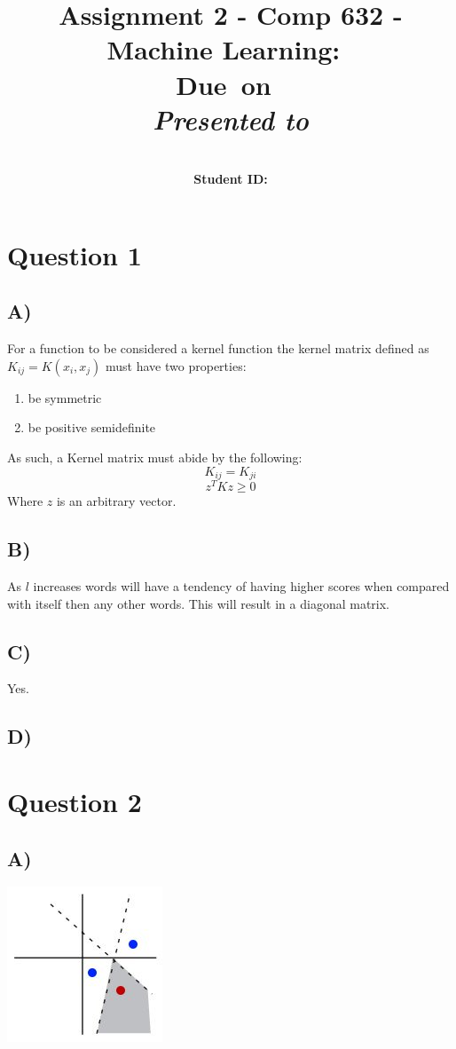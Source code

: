 \documentclass{report}
\title{Assignment 2 - Comp 632 - Machine Learning}
\title{\vspace{2in}\textmd{\textbf{\hmwkClass:\ \hmwkTitle}}\\
\normalsize\vspace{0.1in}\small{Due\ on\ \hmwkDueDate}\\
\vspace{0.1in}\large{\textit{Presented to \hmwkClassInstructor}}\vspace{3in}}
\date{}
\author{\textbf{\hmwkAuthorName}\\
    \textbf{Student ID: \hmwkAuthorNumber}}
\begin{document}
\maketitle
\section*{Question 1}
\subsection*{A)}
For a function to be considered a kernel function the kernel matrix defined as
$K_{ij}=K(x_i,x_j)$ must have two properties:
\begin{enumerate}
  \item be symmetric
  \item be positive semidefinite
\end{enumerate}
As such, a Kernel matrix must abide by the following:
\begin{equation}
  K_{ij} = K_{ji}
\end{equation}
\begin{equation}
  z^{T}Kz\geq 0
\end{equation}
Where $z$ is an arbitrary vector.
\subsection*{B)}
As $l$ increases words will have a tendency of having higher scores when compared
with itself then any other words. This will result in a diagonal matrix.
\subsection*{C)}
Yes.
\subsection*{D)}

\section*{Question 2}
\subsection*{A)}
\includegraphics[width=175px, keepaspectratio]{3points.jpg}
\end{document}
